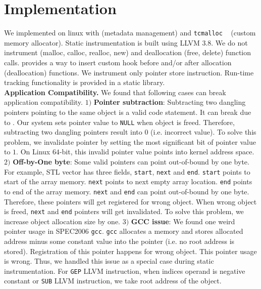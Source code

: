 \section{Implementation}
We implemented \projectname{} on linux with \metalloc{} (metadata management) and \texttt{tcmalloc} ~\cite{ghemawat2009tcmalloc} (custom memory allocator). Static instrumentation is built using LLVM $3.8$. We do not instrument (malloc, calloc, realloc, new) and deallocation (free, delete) function calls. \metalloc{} provides a way to insert custom hook before and/or after allocation (deallocation) functions. We instrument only pointer store instruction. Run-time tracking functionality is provided in a static library. \\

\textbf{Application Compatibility.}
We found that following cases can break application compatibility. $1)$ \textbf{Pointer subtraction}: Subtracting two dangling pointers pointing to the same object is a valid code statement. It can break due to \projectname{}. Our system sets pointer value to \texttt{NULL} when object is freed. Therefore, subtracting two dangling pointers result into $0$ (i.e. incorrect value). To solve this problem, we invalidate pointer by setting the most significant bit of pointer value to $1$. On Linux $64$-bit, this invalid pointer value points into kernel address space. $2)$ \textbf{Off-by-One byte}: Some valid pointers can point out-of-bound by one byte. For example, STL vector has three fields, \texttt{start}, \texttt{next} and \texttt{end}. \texttt{start} points to start of the array memory. \texttt{next} points to next empty array location. \texttt{end} points to end of the array memory. \texttt{next} and \texttt{end} can point out-of-bound by one byte. Therefore, these pointers will get registered for wrong object. When wrong object is freed, \texttt{next} and \texttt{end} pointers will get invalidated. To solve this problem, we increase object allocation size by one. $3)$ \textbf{GCC issue}: We found one weird pointer usage in SPEC2006 \texttt{gcc}. \texttt{gcc} allocates a memory and stores allocated address minus some constant value into the pointer (i.e. no root address is stored). Registration of this pointer happens for wrong object. This pointer usage is wrong. Thus, we handled this issue as a special case during static instrumentation. For \texttt{GEP} LLVM instruction, when indices operand is negative constant or \texttt{SUB} LLVM instruction, we take root address of the object.

